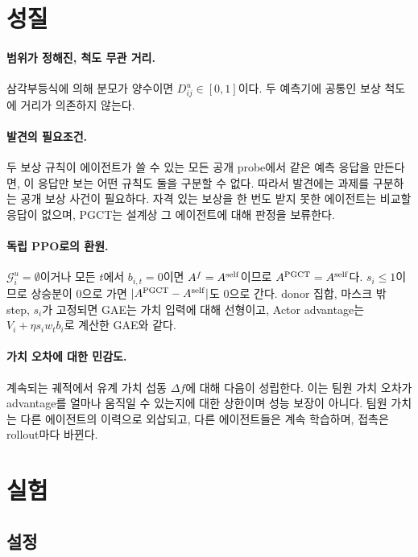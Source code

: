 \documentclass[10pt,twocolumn,letterpaper]{article}
\begin{document}
\section{성질}
\paragraph{범위가 정해진, 척도 무관 거리.} 삼각부등식에 의해 분모가 양수이면 $D_{ij}^u\in[0,1]$이다. 두 예측기에 공통인 보상 척도에 거리가 의존하지 않는다.

\paragraph{발견의 필요조건.} 두 보상 규칙이 에이전트가 쓸 수 있는 모든 공개 probe에서 같은 예측 응답을 만든다면, 이 응답만 보는 어떤 규칙도 둘을 구분할 수 없다. 따라서 발견에는 과제를 구분하는 공개 보상 사건이 필요하다. 자격 있는 보상을 한 번도 받지 못한 에이전트는 비교할 응답이 없으며, PGCT는 설계상 그 에이전트에 대해 판정을 보류한다.

\paragraph{독립 PPO로의 환원.} $\mathcal G_i^u=\emptyset$이거나 모든 $t$에서 $b_{i,t}=0$이면 $A^{f}=A^{\rm self}$이므로 $A^{\rm PGCT}=A^{\rm self}$다. $s_i\le1$이므로 상승분이 0으로 가면 $|A^{\rm PGCT}-A^{\rm self}|$도 0으로 간다. donor 집합, 마스크 밖 step, $s_i$가 고정되면 GAE는 가치 입력에 대해 선형이고, Actor advantage는 $V_i+\eta s_i w_t b_i$로 계산한 GAE와 같다.

\paragraph{가치 오차에 대한 민감도.} 계속되는 궤적에서 유계 가치 섭동 $\Delta f$에 대해 다음이 성립한다.
\BoundEquation
이는 팀원 가치 오차가 advantage를 얼마나 움직일 수 있는지에 대한 상한이며 성능 보장이 아니다. 팀원 가치는 다른 에이전트의 이력으로 외삽되고, 다른 에이전트들은 계속 학습하며, 접촉은 rollout마다 바뀐다.

\section{실험}
\subsection{설정}\label{sec:setup}
\end{document}
